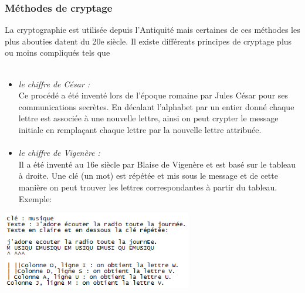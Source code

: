 \documentclass[a4paper,12pt,abstracton,titlepage]{scrartcl}
\begin{document}
\subsubsection{Méthodes de cryptage}
La cryptographie est utilisée depuis l'Antiquité mais certaines de ces méthodes les plus abouties datent du 20e siècle. Il existe différents principes de cryptage plus ou moins compliqués tels que\\
\\
\begin{minipage}[t]{0.5\textwidth}
    \begin{itemize}
    \item \textit{le chiffre de César :}\\
    Ce procédé a été inventé lors de l'époque romaine par Jules César pour ses communications secrètes. En décalant l'alphabet par un entier donné chaque lettre est associée à une nouvelle lettre, ainsi on peut crypter le message initiale en remplaçant chaque lettre par la nouvelle lettre attribuée.
    \paragraph{}
    \item \textit{le chiffre de Vigenère :}\\
    Il a été inventé au 16e siècle par Blaise de Vigenère et est basé sur le tableau à droite. Une clé (un mot) est répétée et mis sous le message et de cette manière on peut trouver les lettres correspondantes à partir du tableau.\\
    Exemple:
    \end{itemize}
    \begin{center}
    \raggedleft
 	\includegraphics[height=3.4cm]{./Pictures/exempleVigenere_neuf.png}
 	\label{exVig}
    \end{center} 
	
  \end{minipage} 
\end{document}
